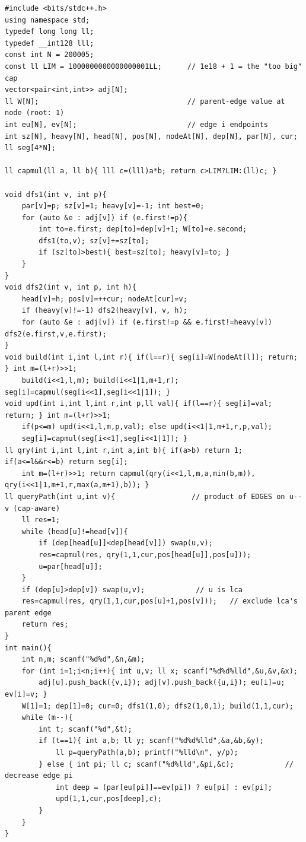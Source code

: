 \begin{lstlisting}[caption={CF 593D full solution: edges at deeper endpoints, segment tree of capped products over pos, path fold excludes the lca slot, point decrease update}, label={lst:c16-593d}]
#include <bits/stdc++.h>
using namespace std;
typedef long long ll;
typedef __int128 lll;
const int N = 200005;
const ll LIM = 1000000000000000001LL;      // 1e18 + 1 = the "too big" cap
vector<pair<int,int>> adj[N];
ll W[N];                                   // parent-edge value at node (root: 1)
int eu[N], ev[N];                          // edge i endpoints
int sz[N], heavy[N], head[N], pos[N], nodeAt[N], dep[N], par[N], cur;
ll seg[4*N];

ll capmul(ll a, ll b){ lll c=(lll)a*b; return c>LIM?LIM:(ll)c; }

void dfs1(int v, int p){
    par[v]=p; sz[v]=1; heavy[v]=-1; int best=0;
    for (auto &e : adj[v]) if (e.first!=p){
        int to=e.first; dep[to]=dep[v]+1; W[to]=e.second;
        dfs1(to,v); sz[v]+=sz[to];
        if (sz[to]>best){ best=sz[to]; heavy[v]=to; }
    }
}
void dfs2(int v, int p, int h){
    head[v]=h; pos[v]=++cur; nodeAt[cur]=v;
    if (heavy[v]!=-1) dfs2(heavy[v], v, h);
    for (auto &e : adj[v]) if (e.first!=p && e.first!=heavy[v]) dfs2(e.first,v,e.first);
}
void build(int i,int l,int r){ if(l==r){ seg[i]=W[nodeAt[l]]; return; } int m=(l+r)>>1;
    build(i<<1,l,m); build(i<<1|1,m+1,r); seg[i]=capmul(seg[i<<1],seg[i<<1|1]); }
void upd(int i,int l,int r,int p,ll val){ if(l==r){ seg[i]=val; return; } int m=(l+r)>>1;
    if(p<=m) upd(i<<1,l,m,p,val); else upd(i<<1|1,m+1,r,p,val);
    seg[i]=capmul(seg[i<<1],seg[i<<1|1]); }
ll qry(int i,int l,int r,int a,int b){ if(a>b) return 1; if(a<=l&&r<=b) return seg[i];
    int m=(l+r)>>1; return capmul(qry(i<<1,l,m,a,min(b,m)), qry(i<<1|1,m+1,r,max(a,m+1),b)); }
ll queryPath(int u,int v){                  // product of EDGES on u--v (cap-aware)
    ll res=1;
    while (head[u]!=head[v]){
        if (dep[head[u]]<dep[head[v]]) swap(u,v);
        res=capmul(res, qry(1,1,cur,pos[head[u]],pos[u]));
        u=par[head[u]];
    }
    if (dep[u]>dep[v]) swap(u,v);            // u is lca
    res=capmul(res, qry(1,1,cur,pos[u]+1,pos[v]));   // exclude lca's parent edge
    return res;
}
int main(){
    int n,m; scanf("%d%d",&n,&m);
    for (int i=1;i<n;i++){ int u,v; ll x; scanf("%d%d%lld",&u,&v,&x);
        adj[u].push_back({v,i}); adj[v].push_back({u,i}); eu[i]=u; ev[i]=v; }
    W[1]=1; dep[1]=0; cur=0; dfs1(1,0); dfs2(1,0,1); build(1,1,cur);
    while (m--){
        int t; scanf("%d",&t);
        if (t==1){ int a,b; ll y; scanf("%d%d%lld",&a,&b,&y);
            ll p=queryPath(a,b); printf("%lld\n", y/p);
        } else { int pi; ll c; scanf("%d%lld",&pi,&c);            // decrease edge pi
            int deep = (par[eu[pi]]==ev[pi]) ? eu[pi] : ev[pi];
            upd(1,1,cur,pos[deep],c);
        }
    }
}
\end{lstlisting}

